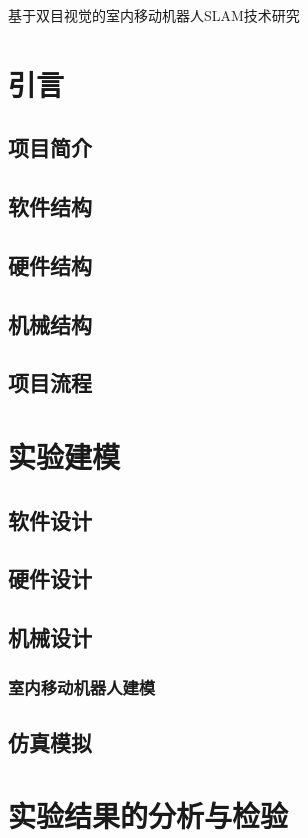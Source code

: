 \documentclass{article}
\begin{document}
\newpage
\begin{center}
	{  \fontsize{16pt}{20pt}\selectfont 基于双目视觉的室内移动机器人SLAM技术研究}
\end{center}
\tableofcontents
\section{引言}

\subsection{项目简介}
\subsection{软件结构}
\subsection{硬件结构}
\subsection{机械结构}
\subsection{项目流程}

\section{实验建模}
\subsection{软件设计}
\subsection{硬件设计}
\subsection{机械设计}
\subsubsection{室内移动机器人建模}
\subsection{仿真模拟}

\section{实验结果的分析与检验}
\end{document}
